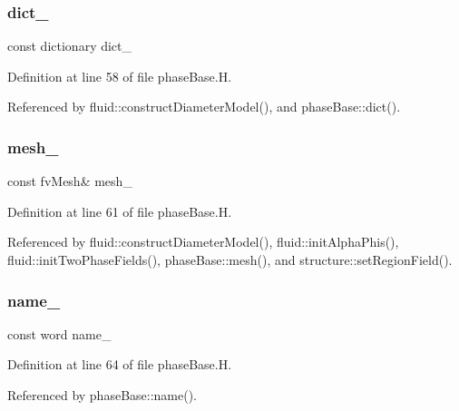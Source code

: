 \subsubsection{\texorpdfstring{dict\+\_\+}{dict\_}}
{\footnotesize\ttfamily const dictionary dict\+\_\+\hspace{0.3cm}{\ttfamily [protected]}}



Definition at line 58 of file phase\+Base.\+H.



Referenced by fluid\+::construct\+Diameter\+Model(), and phase\+Base\+::dict().

\mbox{\label{classFoam_1_1phaseBase_a23edeeeecebcef11921a33dd5d990570}} 
\subsubsection{\texorpdfstring{mesh\+\_\+}{mesh\_}}
{\footnotesize\ttfamily const fv\+Mesh\& mesh\+\_\+\hspace{0.3cm}{\ttfamily [protected]}}



Definition at line 61 of file phase\+Base.\+H.



Referenced by fluid\+::construct\+Diameter\+Model(), fluid\+::init\+Alpha\+Phis(), fluid\+::init\+Two\+Phase\+Fields(), phase\+Base\+::mesh(), and structure\+::set\+Region\+Field().

\mbox{\label{classFoam_1_1phaseBase_afd780271a9c45061cfdc62f5c3fc9929}} 
\subsubsection{\texorpdfstring{name\+\_\+}{name\_}}
{\footnotesize\ttfamily const word name\+\_\+\hspace{0.3cm}{\ttfamily [protected]}}



Definition at line 64 of file phase\+Base.\+H.



Referenced by phase\+Base\+::name().


